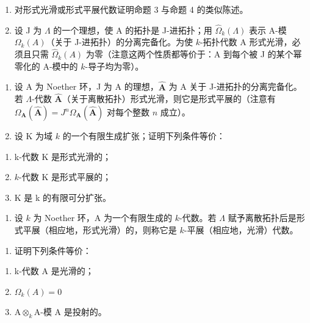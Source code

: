 \begin{enumerate}
\def\labelenumi{\alph{enumi})}
\item
  对形式光滑或形式平展代数证明命题 3 与命题 4 的类似陈述。
\item
  设 J 为 \(\Lambda\) 的一个理想，使 A 的拓扑是 J-进拓扑；用 \(\widehat{\Omega}_{k}(\Lambda)\) 表示 A-模 \(\Omega_{k}(A)\)（关于 J-进拓扑）的分离完备化。为使 \(k\)-拓扑代数 A 形式光滑，必须且只需 \(\widehat{\Omega}_{k}(A)\) 为零（注意这两个性质都等价于：A 到每个被 J 的某个幂零化的 A-模中的 \(k\)-导子均为零）。
\end{enumerate}

\begin{enumerate}
\def\labelenumi{\arabic{enumi})}
\setcounter{enumi}{1}
\item
  设 A 为 Noether 环，J 为 A 的理想，\(\widehat{\mathbf{A}}\) 为 A 关于 J-进拓扑的分离完备化。若 \(\Lambda\)-代数 \(\widehat{\mathbf{A}}\)（关于离散拓扑）形式光滑，则它是形式平展的（注意有 \(\Omega_{\mathbf{A}}(\widehat{\mathbf{A}}) = J^{n}\Omega_{\mathbf{A}}(\widehat{\mathbf{A}})\) 对每个整数 \(n\) 成立）。
\item
  设 K 为域 \(k\) 的一个有限生成扩张；证明下列条件等价：
\end{enumerate}

\begin{enumerate}
\def\labelenumi{(\roman{enumi})}
\item
  k-代数 K 是形式光滑的；
\item
  \(k\)-代数 K 是形式平展的；
\item
  K 是 k 的有限可分扩张。
\end{enumerate}

\begin{enumerate}
\def\labelenumi{\arabic{enumi})}
\setcounter{enumi}{3}
\tightlist
\item
  设 \(k\) 为 Noether 环，A 为一个有限生成的 \(k\)-代数。若 \(\Lambda\) 赋予离散拓扑后是形式平展（相应地，形式光滑）的，则称它是 \(k\)-平展（相应地，光滑）代数。
\end{enumerate}

\begin{enumerate}
\def\labelenumi{\alph{enumi})}
\tightlist
\item
  证明下列条件等价：
\end{enumerate}

\begin{enumerate}
\def\labelenumi{(\roman{enumi})}
\item
  k-代数 A 是光滑的；
\item
  \(\Omega_k(A) = 0\)
\item
  \(\mathrm{A}\otimes_{k}\mathrm{A}\)-模 A 是投射的。
\end{enumerate}

